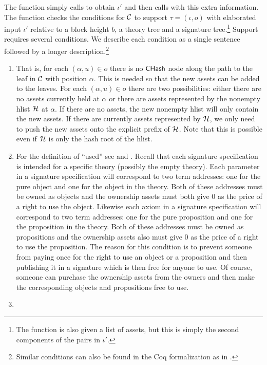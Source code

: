 The function {} simply
calls {} to obtain $\iota'$
and then calls {} with this extra information.
The function {} checks the conditions for
$\mathcal{C}$ to support $\tau=(\iota,o)$ with elaborated input $\iota'$
relative to a block height $b$, a theory tree and a signature tree.\footnote{The function {} is also given a list of assets, but this is simply the second components of the pairs in $\iota'$.}
Support requires several conditions.
We describe each condition as a single sentence followed by
a longer description.\footnote{Similar conditions can also be found in the Coq formalization as {} in {}.}
\begin{enumerate}
\item {}
That is, for each $(\alpha,u)\in o$ there is no ${\constr{CHash}}$ node along the
path to the leaf in $\mathcal{C}$ with position $\alpha$.
This is needed so that the new assets can be added to the leaves.
For each $(\alpha,u)\in o$ there are two possibilities: either there are no assets currently
held at $\alpha$
or there are assets represented by the nonempty hlist $\mathcal{H}$ at $\alpha$.
If there are no assets, the new nonempty hlist will only contain the new assets.
If there are currently assets represented by $\mathcal{H}$, we only need to
push the new assets onto the explicit prefix of $\mathcal{H}$.
Note that this is possible even if $\mathcal{H}$ is only the hash root of the hlist.
\item {}
For the definition of ``used'' see
{}
and
{}.
Recall that each signature specification is intended for a specific theory (possibly the empty theory).
Each parameter in a signature specification will correspond to two term
addresses: one for the pure object and one for the object in the theory.
Both of these addresses must be owned as objects and the ownership assets
must both give $0$ as the price of a right to use the object.
Likewise each axiom in a signature specification will correspond to two term
addresses: one for the pure proposition and one for the proposition in the theory.
Both of these addresses must be owned as propositions and the ownership assets
also must give $0$ as the price of a right to use the proposition.
The reason for this condition is to prevent someone from paying once
for the right to use an object or a proposition
and then publishing it in a signature which is then free for anyone to use.
Of course, someone can purchase the ownership assets from the owners
and then make the corresponding objects and propositions free to use.
\item {}


\end{enumerate}
